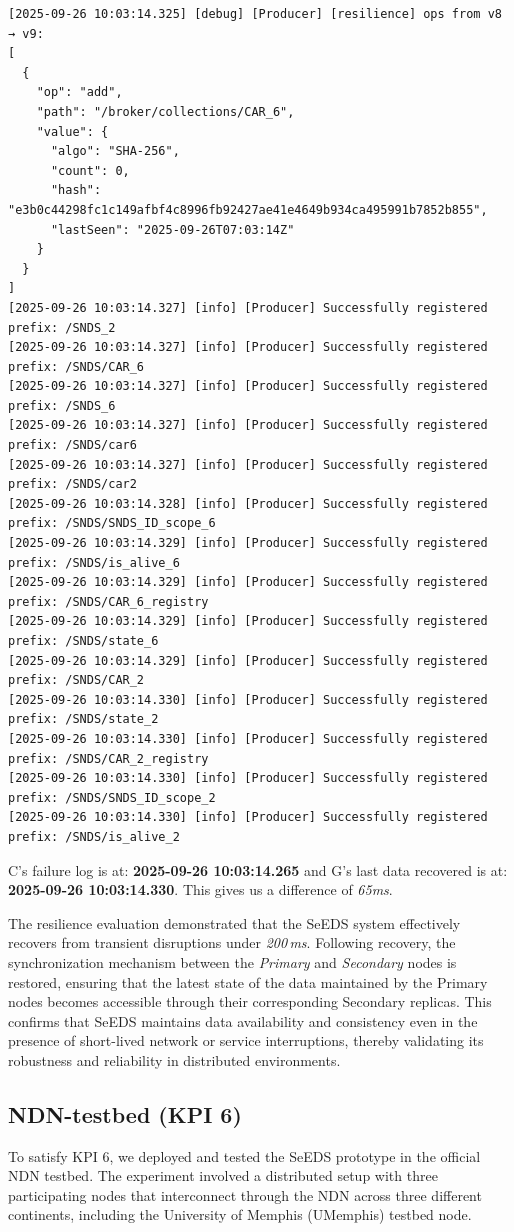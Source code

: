 \documentclass{article}
\begin{document}
\begin{lstlisting}[language=log, caption={Recovery of Node C through Node G}, label={lst:recovery-of-node-c-g}]
[2025-09-26 10:03:14.325] [debug] [Producer] [resilience] ops from v8 → v9:
[
  {
    "op": "add",
    "path": "/broker/collections/CAR_6",
    "value": {
      "algo": "SHA-256",
      "count": 0,
      "hash": "e3b0c44298fc1c149afbf4c8996fb92427ae41e4649b934ca495991b7852b855",
      "lastSeen": "2025-09-26T07:03:14Z"
    }
  }
]
[2025-09-26 10:03:14.327] [info] [Producer] Successfully registered prefix: /SNDS_2
[2025-09-26 10:03:14.327] [info] [Producer] Successfully registered prefix: /SNDS/CAR_6
[2025-09-26 10:03:14.327] [info] [Producer] Successfully registered prefix: /SNDS_6
[2025-09-26 10:03:14.327] [info] [Producer] Successfully registered prefix: /SNDS/car6
[2025-09-26 10:03:14.327] [info] [Producer] Successfully registered prefix: /SNDS/car2
[2025-09-26 10:03:14.328] [info] [Producer] Successfully registered prefix: /SNDS/SNDS_ID_scope_6
[2025-09-26 10:03:14.329] [info] [Producer] Successfully registered prefix: /SNDS/is_alive_6
[2025-09-26 10:03:14.329] [info] [Producer] Successfully registered prefix: /SNDS/CAR_6_registry
[2025-09-26 10:03:14.329] [info] [Producer] Successfully registered prefix: /SNDS/state_6
[2025-09-26 10:03:14.329] [info] [Producer] Successfully registered prefix: /SNDS/CAR_2
[2025-09-26 10:03:14.330] [info] [Producer] Successfully registered prefix: /SNDS/state_2
[2025-09-26 10:03:14.330] [info] [Producer] Successfully registered prefix: /SNDS/CAR_2_registry
[2025-09-26 10:03:14.330] [info] [Producer] Successfully registered prefix: /SNDS/SNDS_ID_scope_2
[2025-09-26 10:03:14.330] [info] [Producer] Successfully registered prefix: /SNDS/is_alive_2 
\end{lstlisting}

C's failure log is at: \textbf{2025-09-26 10:03:14.265} and G's last data recovered is at: \textbf{2025-09-26 10:03:14.330}. This gives us a difference of \textit{65ms}.

The resilience evaluation demonstrated that the SeEDS system effectively recovers from transient disruptions under \emph{200\,ms}. Following recovery, the synchronization mechanism between the \emph{Primary} and \emph{Secondary} nodes is restored, ensuring that the latest state of the data maintained by the Primary nodes becomes accessible through their corresponding Secondary replicas. This confirms that SeEDS maintains data availability and consistency even in the presence of short-lived network or service interruptions, thereby validating its robustness and reliability in distributed environments.

\subsection{NDN-testbed (KPI 6)}
To satisfy KPI 6, we deployed and tested the SeEDS prototype in the official NDN testbed. The experiment involved a distributed setup with three participating nodes that interconnect through the NDN across three different continents, including the University of Memphis (UMemphis) testbed node.
\end{document}

